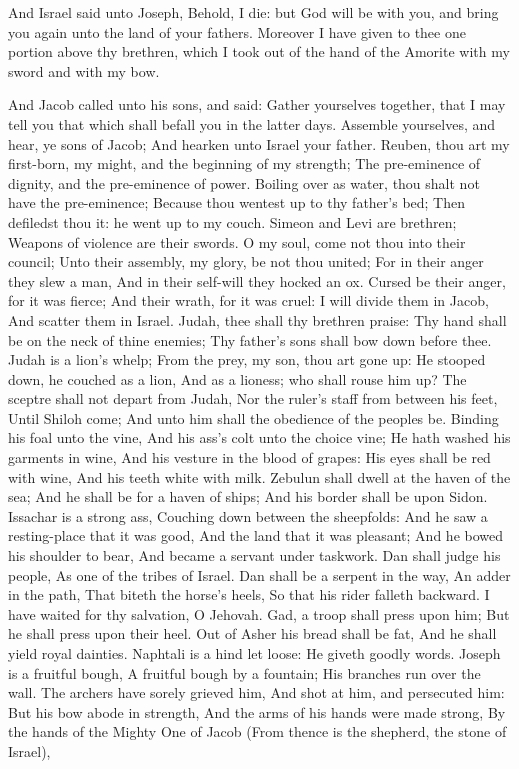 And Israel said unto Joseph, Behold, I die: but God will be with you, and bring you again unto the land of your fathers. Moreover I have given to thee one portion above thy brethren, which I took out of the hand of the Amorite with my sword and with my bow. 

And Jacob called unto his sons, and said: Gather yourselves together, that I may tell you that which shall befall you in the latter days.  Assemble yourselves, and hear, ye sons of Jacob; And hearken unto Israel your father.  Reuben, thou art my first-born, my might, and the beginning of my strength; The pre-eminence of dignity, and the pre-eminence of power.  Boiling over as water, thou shalt not have the pre-eminence; Because thou wentest up to thy father’s bed; Then defiledst thou it: he went up to my couch.  Simeon and Levi are brethren; Weapons of violence are their swords.  O my soul, come not thou into their council; Unto their assembly, my glory, be not thou united; For in their anger they slew a man, And in their self-will they hocked an ox.  Cursed be their anger, for it was fierce; And their wrath, for it was cruel: I will divide them in Jacob, And scatter them in Israel.  Judah, thee shall thy brethren praise: Thy hand shall be on the neck of thine enemies; Thy father’s sons shall bow down before thee.  Judah is a lion’s whelp; From the prey, my son, thou art gone up: He stooped down, he couched as a lion, And as a lioness; who shall rouse him up?  The sceptre shall not depart from Judah, Nor the ruler’s staff from between his feet, Until Shiloh come; And unto him shall the obedience of the peoples be.  Binding his foal unto the vine, And his ass’s colt unto the choice vine; He hath washed his garments in wine, And his vesture in the blood of grapes:  His eyes shall be red with wine, And his teeth white with milk.  Zebulun shall dwell at the haven of the sea; And he shall be for a haven of ships; And his border shall be upon Sidon.  Issachar is a strong ass, Couching down between the sheepfolds:  And he saw a resting-place that it was good, And the land that it was pleasant; And he bowed his shoulder to bear, And became a servant under taskwork.  Dan shall judge his people, As one of the tribes of Israel.  Dan shall be a serpent in the way, An adder in the path, That biteth the horse’s heels, So that his rider falleth backward.  I have waited for thy salvation, O Jehovah.  Gad, a troop shall press upon him; But he shall press upon their heel.  Out of Asher his bread shall be fat, And he shall yield royal dainties.  Naphtali is a hind let loose: He giveth goodly words.  Joseph is a fruitful bough, A fruitful bough by a fountain; His branches run over the wall.  The archers have sorely grieved him, And shot at him, and persecuted him:  But his bow abode in strength, And the arms of his hands were made strong, By the hands of the Mighty One of Jacob (From thence is the shepherd, the stone of Israel),  